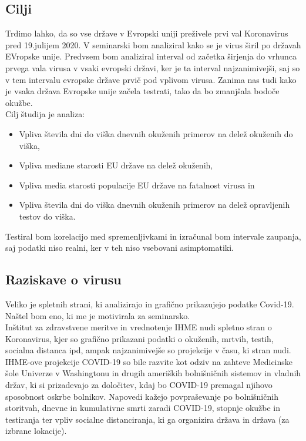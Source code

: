 \documentclass[a4paper,11pt]{article}
\begin{document}
\subsection{Cilji}
Trdimo lahko, da so vse države v Evropski uniji preživele prvi val Koronavirus pred 19.julijem 2020. V seminarski bom analiziral kako se je virus širil po državah EVropske unije. Predvsem bom analiziral interval od začetka širjenja do vrhunca prvega vala virusa v vsaki evropski državi, ker je ta interval najzanimivejši, saj so v tem intervalu evropske države prvič pod vplivom virusa. Zanima nas tudi kako je vsaka država Evropske unije začela testrati, tako da bo zmanjšala bodoče okužbe. \\
Cilj študija je analiza:
\begin{itemize}
\item{Vpliva števila dni do viška dnevnih okuženih primerov na delež okuženih do viška,}
\item{Vpliva mediane starosti EU države na delež okuženih,}
\item{Vpliva media starosti populacije EU države na fatalnost virusa in}
\item{Vpliva števila dni do viška dnevnih okuženih primerov na delež opravljenih testov do viška. }
\end{itemize}
Testiral bom korelacijo med spremenljivkami in izračunal bom intervale zaupanja, saj podatki niso realni, ker v teh niso vsebovani asimptomatiki.

\subsection{Raziskave o virusu}
Veliko je spletnih strani, ki analizirajo in grafično prikazujejo podatke Covid-19. Naštel bom eno, ki me je motivirala za seminarsko. \\
Inštitut za zdravstvene meritve in vrednotenje IHME nudi spletno stran o Koronavirus, kjer so grafično prikazani podatki o okuženih, mrtvih, testih, socialna distanca ipd, ampak najzanimivejše so projekcije v času, ki stran nudi. IHME-ove projekcije COVID-19 so bile razvite kot odziv na zahteve Medicinske šole Univerze v Washingtonu in drugih ameriških bolnišničnih sistemov in vladnih držav, ki si prizadevajo za določitev, kdaj bo COVID-19 premagal njihovo sposobnost oskrbe bolnikov. Napovedi kažejo povpraševanje po bolnišničnih storitvah, dnevne in kumulativne smrti zaradi COVID-19, stopnje okužbe in testiranja ter vpliv socialne distanciranja, ki ga organizira država in država (za izbrane lokacije).
\end{document}
